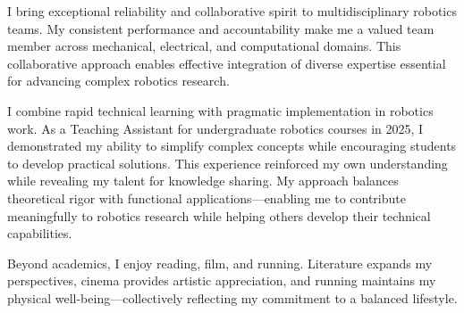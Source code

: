 
\begin{cvparagraph}
I bring exceptional reliability and collaborative spirit to multidisciplinary robotics teams. My consistent performance and accountability make me a valued team member across mechanical, electrical, and computational domains. This collaborative approach enables effective integration of diverse expertise essential for advancing complex robotics research.
\end{cvparagraph}

\begin{cvparagraph}
I combine rapid technical learning with pragmatic implementation in robotics work. As a Teaching Assistant for undergraduate robotics courses in 2025, I demonstrated my ability to simplify complex concepts while encouraging students to develop practical solutions. This experience reinforced my own understanding while revealing my talent for knowledge sharing. My approach balances theoretical rigor with functional applications—enabling me to contribute meaningfully to robotics research while helping others develop their technical capabilities.
\end{cvparagraph}

\begin{cvparagraph}
Beyond academics, I enjoy reading, film, and running. Literature expands my perspectives, cinema provides artistic appreciation, and running maintains my physical well-being—collectively reflecting my commitment to a balanced lifestyle.
\end{cvparagraph}